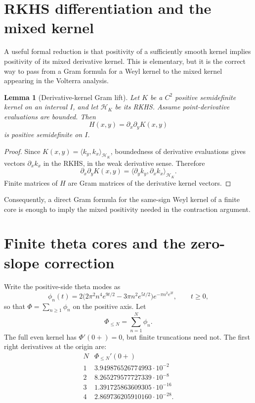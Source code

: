 \documentclass[11pt]{article}
\newtheorem{lemma}[theorem]{Lemma}
\begin{document}
\section{RKHS differentiation and the mixed kernel}

A useful formal reduction is that positivity of a sufficiently smooth kernel
implies positivity of its mixed derivative kernel.  This is elementary, but it
is the correct way to pass from a Gram formula for a Weyl kernel to the mixed
kernel appearing in the Volterra analysis.

\begin{lemma}[Derivative-kernel Gram lift]
Let $K$ be a $C^2$ positive semidefinite kernel on an interval $I$, and let
$\mathcal H_K$ be its RKHS.  Assume point-derivative evaluations are bounded.
Then
\[
     H(x,y)=\partial_x\partial_yK(x,y)
\]
is positive semidefinite on $I$.
\end{lemma}

\begin{proof}
Since $K(x,y)=\langle k_y,k_x\rangle_{\mathcal H_K}$, boundedness of
derivative evaluations gives vectors $\partial_x k_x$ in the RKHS, in the
weak derivative sense.  Therefore
\[
  \partial_x\partial_yK(x,y)
     =\langle \partial_y k_y,\partial_x k_x\rangle_{\mathcal H_K}.
\]
Finite matrices of $H$ are Gram matrices of the derivative kernel vectors.
\end{proof}

Consequently, a direct Gram formula for the same-sign Weyl kernel of a finite
core is enough to imply the mixed positivity needed in the contraction
argument.

\section{Finite theta cores and the zero-slope correction}

Write the positive-side theta modes as
\[
   \phi_n(t)
   =
   2\bigl(2\pi^2 n^4e^{9t/2}-3\pi n^2e^{5t/2}\bigr)
   e^{-\pi n^2e^{2t}},
   \qquad t\ge 0,
\]
so that $\Phi=\sum_{n\ge 1}\phi_n$ on the positive axis.  Let
\[
   \Phi_{\le N}=\sum_{n=1}^N\phi_n.
\]
The full even kernel has $\Phi'(0+)=0$, but finite truncations need not.
The first right derivatives at the origin are:
\[
\begin{array}{c|c}
N & \Phi_{\le N}'(0+)\\
\hline
1 & 3.949876526774993\cdot 10^{-2}\\
2 & 8.265279577727339\cdot 10^{-8}\\
3 & 1.391725863609305\cdot 10^{-16}\\
4 & 2.869736205910160\cdot 10^{-28}.
\end{array}
\]
\end{document}

